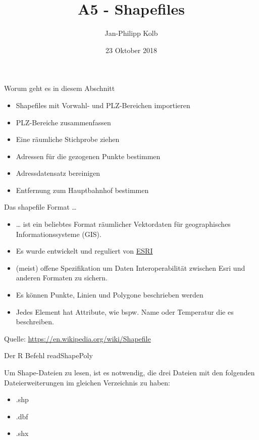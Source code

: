 \documentclass[ignorenonframetext,]{beamer}
\title{A5 - Shapefiles}
\author{Jan-Philipp Kolb}
\date{23 Oktober 2018}
\providecommand{\tightlist}{%
  \setlength{\itemsep}{0pt}\setlength{\parskip}{0pt}}
\begin{document}
\frame{\titlepage}

\begin{frame}{Worum geht es in diesem Abschnitt}

\begin{itemize}
\tightlist
\item
  Shapefiles mit Vorwahl- und PLZ-Bereichen importieren
\item
  PLZ-Bereiche zusammenfassen
\item
  Eine räumliche Stichprobe ziehen
\item
  Adressen für die gezogenen Punkte bestimmen
\item
  Adressdatensatz bereinigen
\item
  Entfernung zum Hauptbahnhof bestimmen
\end{itemize}

\end{frame}

\begin{frame}{Das shapefile Format \ldots{}}

\begin{itemize}
\item
  \ldots{} ist ein beliebtes Format räumlicher Vektordaten für
  geographisches Informationssysteme (GIS).
\item
  Es wurde entwickelt und reguliert von
  \href{http://www.esri.com/}{ESRI}
\item
  (meist) offene Spezifikation um Daten Interoperabilität zwischen Esri
  und anderen Formaten zu sichern.
\item
  Es können Punkte, Linien und Polygone beschrieben werden
\item
  Jedes Element hat Attribute, wie bspw. Name oder Temperatur die es
  beschreiben.
\end{itemize}

Quelle: \url{https://en.wikipedia.org/wiki/Shapefile}

\end{frame}

\begin{frame}{Der R Befehl readShapePoly}

Um Shape-Dateien zu lesen, ist es notwendig, die drei Dateien mit den
folgenden Dateierweiterungen im gleichen Verzeichnis zu haben:

\begin{itemize}
\tightlist
\item
  .shp
\item
  .dbf
\item
  .shx
\end{itemize}

\end{frame}
\end{document}
